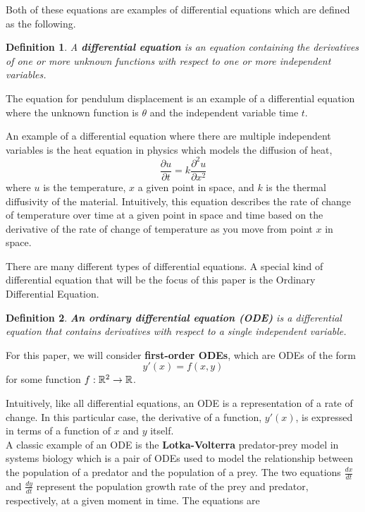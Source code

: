 \documentclass{article}
\newtheorem{definition}{Definition}
\theoremstyle{remark}
\begin{document}
Both of these equations are examples of differential equations which are defined as the following.
\begin{definition} A \textbf{differential equation} is an equation containing the derivatives of one or more unknown functions with respect to one or more independent variables.
\end{definition}

The equation for pendulum displacement is an example of a differential equation where the unknown function is $\theta$ and the independent variable time $t$.

An example of a differential equation where there are multiple independent variables is the heat equation in physics which models the diffusion of heat,
$$\frac{\partial u}{\partial t} = k\frac{\partial^2 u}{\partial x^2}$$
\noindent where $u$ is the temperature, $x$ a given point in space, and $k$ is the thermal diffusivity of the material. Intuitively, this equation describes the rate of change of temperature over time at a given point in space and time based on the derivative of the rate of change of temperature as you move from point $x$ in space.

There are many different types of differential equations. A special kind of differential equation that will be the focus of this paper is the Ordinary Differential Equation.

\begin{definition}
\textbf{An ordinary differential equation (ODE)} is 
    a differential equation that contains derivatives with respect to a single independent variable.
\end{definition}



For this paper, we  will consider \textbf{first-order ODEs}, which are ODEs of the form
$$y'(x) = f(x,y)$$
\noindent for some function $f: \Bbb R^2 \to \Bbb R$.

Intuitively, like all differential equations, an ODE is a representation of a rate of change. In this particular case, the derivative of a function, $y'(x)$, is expressed in terms of a function of $x$ and $y$ itself. \\


A classic example of an ODE is the \textbf{Lotka-Volterra} predator-prey model in systems biology which is a pair of ODEs used to model the relationship between the population of a predator and the population of a prey. The two equations $\frac{dx}{dt}$ and $\frac{dy}{dt}$ represent the population growth rate of the prey and predator, respectively, at a given moment in time. The equations are
\end{document}
